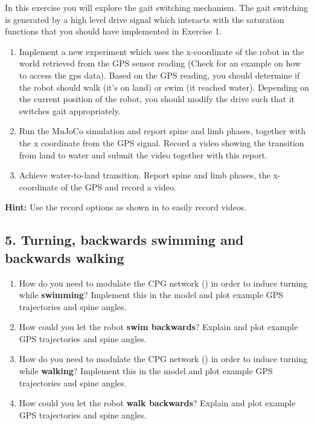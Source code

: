 \documentclass{cmc}
\begin{document}
In this exercise you will explore the gait switching mechanism. The gait
switching is generated by a high level drive signal which interacts with the
saturation functions that you should have implemented in Exercise 1.

\begin{enumerate}
\item  Implement a new
  experiment which uses the x-coordinate of the robot in the world retrieved
  from the GPS sensor reading (Check  for an example on how
  to access the gps data). Based on the GPS reading,
  you should determine if the robot should walk (it's on land) or swim (it
  reached water). Depending on the current position of the robot, you should
  modify the drive such that it switches gait appropriately.
\item Run the MuJoCo simulation and report spine and limb phases, together with
  the x coordinate from the GPS signal. Record a video showing the transition
  from land to water and submit the video together with this report.
\item Achieve water-to-land transition. Report spine and limb phases,
  the x-coordinate of the GPS and record a video.
\end{enumerate}

\textbf{Hint:} Use the record options as shown in  to
easily record videos.

\newpage
\subsection*{5. Turning, backwards swimming and backwards walking}\label{sec:turning-backwards}

\begin{enumerate}
\item How do you need to modulate the CPG network () in order
  to induce turning while \textbf{swimming}?  Implement this in the model and plot example GPS
  trajectories and spine angles.
\item How could you let the robot \textbf{swim backwards}? Explain and plot example GPS
  trajectories and spine angles.
  \item How do you need to modulate the CPG network () in order
  to induce turning while  \textbf{walking}?  Implement this in the model and plot example GPS
  trajectories and spine angles.
\item How could you let the robot \textbf{walk backwards}? Explain and plot example GPS
  trajectories and spine angles.
\end{enumerate}
\end{document}
